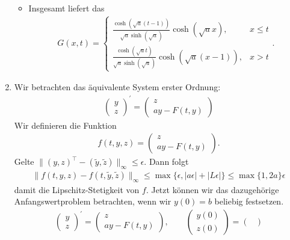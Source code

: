 \begin{solution}
\begin{enumerate}[label = \textbf{\alph*)}]
\begin{itemize}
    \item Insgesamt liefert das
    \begin{align*}
      G(x,t) = \begin{cases}
      \frac{\cosh(\sqrt{a}(t-1))}{\sqrt{a}\sinh(\sqrt{a})}\cosh(\sqrt{a}x), & x \leq t \\
      \frac{\cosh(\sqrt{a}t)}{\sqrt{a}\sinh(\sqrt{a})}\cosh(\sqrt{a}(x-1)), & x > t
      \end{cases}.
    \end{align*}
  \end{itemize}
  \item Wir betrachten das äquivalente System erster Ordnung:
  \begin{align*}
    \begin{pmatrix}
      y \\ z
    \end{pmatrix}^{\prime} =
    \begin{pmatrix}
      z \\ ay - F(t,y)
    \end{pmatrix}
  \end{align*}
  Wir definieren die Funktion
  \begin{align*}
    f(t,y,z) = \begin{pmatrix}
      z \\ ay - F(t,y)
    \end{pmatrix}.
  \end{align*}
  Gelte $\|(y,z)^{\top} - (\widetilde{y},\widetilde{z})\|_{\infty} \leq \epsilon$. Dann folgt
  \begin{align*}
    \|f(t,y,z) - f(t,\widetilde{y},\widetilde{z})\|_{\infty} \leq \max\{\epsilon, |a\epsilon| + |L\epsilon|\} \leq \max\{1,2a\}\epsilon
  \end{align*}
  damit die Lipschitz-Stetigkeit von $f$.
  Jetzt können wir das dazugehörige Anfangswertproblem betrachten, wenn wir $y(0) = b$ beliebig festsetzen.
  \begin{align*}
    \begin{pmatrix}
      y \\ z
    \end{pmatrix}^{\prime} =
    \begin{pmatrix}
      z \\ ay - F(t,y)
    \end{pmatrix}, \qquad
    \begin{pmatrix}
      y(0) \\ z(0)
    \end{pmatrix}
    = \begin{pmatrix}

\end{pmatrix}
\end{align*}
\end{enumerate}
\end{solution}
